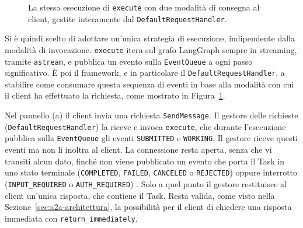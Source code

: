 \begin{figure}[htbp]
    \caption{La stessa esecuzione di \texttt{execute} con due modalità di consegna al client, gestite interamente dal \texttt{DefaultRequestHandler}.}
    \label{fig:sequence-comparison}
\end{figure}

Si è quindi scelto di adottare un'unica strategia di esecuzione, indipendente dalla modalità di invocazione. \texttt{execute} itera sul grafo LangGraph sempre in streaming, tramite \texttt{astream}, e pubblica un evento sulla \texttt{EventQueue} a ogni passo significativo. È poi il framework, e in particolare il \texttt{DefaultRequestHandler}, a stabilire come consumare questa sequenza di eventi \cite{a2apythontutorial} in base alla modalità con cui il client ha effettuato la richiesta, come mostrato in Figura~\ref{fig:sequence-comparison}.

Nel pannello (a) il client invia una richiesta \texttt{SendMessage}. Il gestore delle richieste (\texttt{Default\allowbreak Request\allowbreak Handler}) la riceve e invoca \texttt{execute}, che durante l'esecuzione pubblica sulla \texttt{EventQueue} gli eventi \texttt{SUBMITTED} e \texttt{WORKING}. Il gestore riceve questi eventi ma non li inoltra al client. La connessione resta aperta, senza che vi transiti alcun dato, finché non viene pubblicato un evento che porta il Task in uno stato terminale (\texttt{COMPLETED}, \texttt{FAILED}, \texttt{CANCELED} o \texttt{REJECTED}) oppure interrotto (\texttt{INPUT\_REQUIRED} o \texttt{AUTH\_REQUIRED}) \cite{a2aspec}. Solo a quel punto il gestore restituisce al client un'unica risposta, che contiene il Task. Resta valida, come visto nella Sezione~\ref{sec:a2a-architettura}, la possibilità per il client di chiedere una risposta immediata con \texttt{return\_immediately}.

